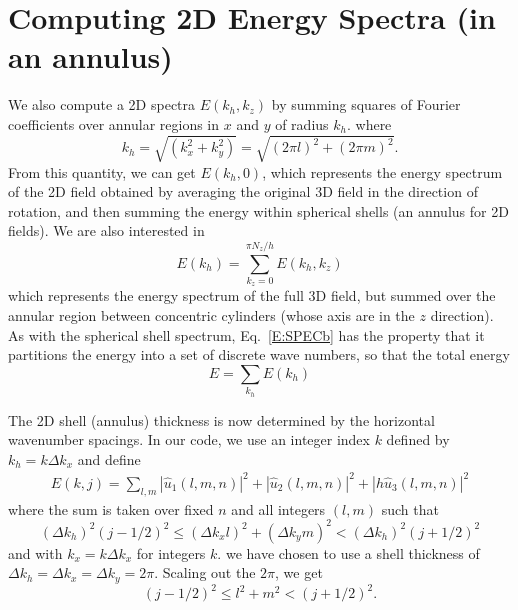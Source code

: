 \documentclass[12pt]{article}
\begin{document}
\section{Computing 2D Energy Spectra (in an annulus)}
We also compute a 2D spectra $E(k_h,k_z)$ by summing squares of Fourier
coefficients over annular regions in 
$x$ and $y$ of radius $k_h$.  
where 
\[
k_h = \sqrt{(k_x^2 + k_y^2)} = \sqrt{(2\pi l)^2 + (2\pi m)^2}. 
\]
From this quantity, we can get $E(k_h,0)$, which 
represents the energy spectrum of the 2D field
obtained by averaging the original 3D field  in the direction of rotation,
and then summing the energy within spherical shells (an annulus for 2D fields).
We are also interested in 
\begin{equation}
E(k_h) = \sum_{k_z=0}^{\pi N_z/h} E(k_h,k_z) 
\label{E:SPECb}
\end{equation}
which represents 
the energy spectrum of the full 3D field, but summed over
the annular region between concentric cylinders
(whose axis are in the $z$ direction).  As with the spherical
shell spectrum, Eq.~\ref{E:SPECb} has the property that
it partitions the energy into a set of discrete wave numbers, so
that the total energy 
\[
E = \sum_{k_h} E(k_h)
\]


The 2D shell (annulus) thickness is now
determined by the horizontal wavenumber spacings. In our code,
we use an integer index $k$ defined by $k_h = k \Delta k_x$ and
define
\begin{eqnarray*}
E(k,j) = \sum_{l,m}  |  {\hat u_1}(l,m,n) |^2 +
 |  {\hat u_2}(l,m,n) |^2 + 
 |  h {\hat u_3}(l,m,n) |^2
\end{eqnarray*}
where the sum is taken over fixed $n$ and all integers $(l,m)$ such that 
\[
(\Delta k_h)^2 (j-1/2)^2 \le (\Delta k_x l)^2 + (\Delta k_y m)^2  <  (\Delta k_h)^2 (j+1/2)^2 
\]
and with $k_x=k \Delta k_x$ for integers $k$.  
we have chosen to use a shell thickness of $\Delta k_h =\Delta k_x = \Delta
k_y = 2\pi$. Scaling out the $2\pi$, we get
\[
(j-1/2)^2 \le  l^2 +  m^2 < (j+1/2)^2.
\]  
\end{document}
